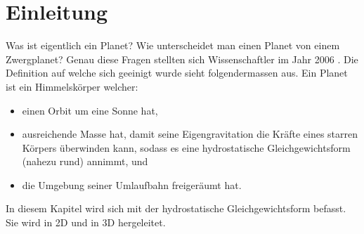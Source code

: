 %
%
%
%
\section{Einleitung\label{planet:section:einleitung}}
Was ist eigentlich ein Planet?
Wie unterscheidet man einen Planet von einem Zwergplanet?
Genau diese Fragen stellten sich Wissenschaftler im Jahr 2006 \cite{planet:iaub5}.
Die Definition auf welche sich geeinigt wurde sieht folgendermassen aus.
Ein Planet ist ein Himmelskörper welcher:
\begin{itemize}
	\item einen Orbit um eine Sonne hat,
	\item ausreichende Masse hat, damit seine Eigengravitation die Kräfte eines starren Körpers überwinden kann, sodass es eine hydrostatische Gleichgewichtsform (nahezu rund) annimmt, und
	\item die Umgebung seiner Umlaufbahn freigeräumt hat.
\end{itemize}

In diesem Kapitel wird sich mit der hydrostatische Gleichgewichtsform befasst.
Sie wird in 2D und in 3D hergeleitet.



